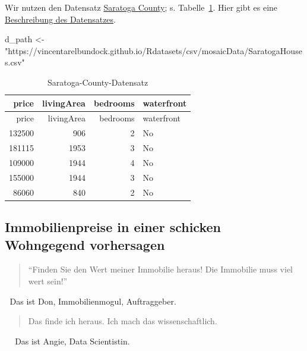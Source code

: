 \documentclass[
  a4paper,
  DIV=11]{scrreprt}
\newenvironment{Shaded}{\begin{snugshade}}{\end{snugshade}}
\newcommand{\NormalTok}[1]{\textcolor[rgb]{0.00,0.23,0.31}{#1}}
\newcommand{\OtherTok}[1]{\textcolor[rgb]{0.00,0.23,0.31}{#1}}
\newcommand{\StringTok}[1]{\textcolor[rgb]{0.13,0.47,0.30}{#1}}
\theoremstyle{definition}
\theoremstyle{remark}
\begin{document}
Wir nutzen den Datensatz
\href{https://vincentarelbundock.github.io/Rdatasets/csv/mosaicData/SaratogaHouses.csv}{Saratoga
County}; s. Tabelle~\ref{tbl-saratoga}. Hier gibt es eine
\href{https://vincentarelbundock.github.io/Rdatasets/doc/mosaicData/SaratogaHouses.html}{Beschreibung
des Datensatzes}.

\begin{Shaded}
\begin{Highlighting}[]
\NormalTok{d\_path }\OtherTok{\textless{}{-}} \StringTok{"https://vincentarelbundock.github.io/Rdatasets/csv/mosaicData/SaratogaHouses.csv"}
\end{Highlighting}
\end{Shaded}

\hypertarget{tbl-saratoga}{}
\begin{longtable}[]{@{}rrrl@{}}
\caption{\label{tbl-saratoga}Saratoga-County-Datensatz}\tabularnewline
\toprule()
price & livingArea & bedrooms & waterfront \\
\midrule()
\endfirsthead
\toprule()
price & livingArea & bedrooms & waterfront \\
\midrule()
\endhead
132500 & 906 & 2 & No \\
181115 & 1953 & 3 & No \\
109000 & 1944 & 4 & No \\
155000 & 1944 & 3 & No \\
86060 & 840 & 2 & No \\
\bottomrule()
\end{longtable}

\hypertarget{immobilienpreise-in-einer-schicken-wohngegend-vorhersagen}{%
\subsection{Immobilienpreise in einer schicken Wohngegend
vorhersagen}\label{immobilienpreise-in-einer-schicken-wohngegend-vorhersagen}}

\begin{quote}
``Finden Sie den Wert meiner Immobilie heraus! Die Immobilie muss viel
wert sein!''
\end{quote}

🧑 Das ist Don, Immobilienmogul, Auftraggeber.

\begin{quote}
Das finde ich heraus. Ich mach das wissenschaftlich.
\end{quote}

👩 🔬 Das ist Angie, Data Scientistin.
\end{document}
